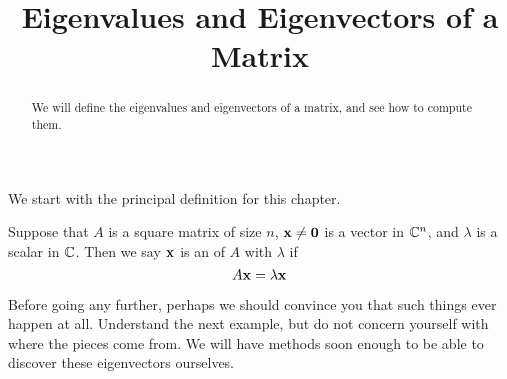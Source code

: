 \documentclass{ximera}
\title{Eigenvalues and Eigenvectors of a Matrix}
\begin{document}
\begin{abstract}
  We will define the eigenvalues and eigenvectors of a matrix, and see how to compute them.  
\end{abstract}
\maketitle

We start with the principal definition for this chapter.

\begin{definition}
  Suppose that $A$ is a square matrix of size $n$,
  $\mathbf{x}\neq\mathbf{0}$ is a vector in $\mathbb{C}^{n}$, and
  $\lambda$ is a scalar in $\mathbb{C}$.  Then we say $\mathbf{x}$ is an
   of $A$ with  $\lambda$ if
  \[
    A\mathbf{x}=\lambda\mathbf{x}
  \]
\end{definition}

Before going any further, perhaps we should convince you that such
things ever happen at all.  Understand the next example, but do not
concern yourself with where the pieces come from.  We will have
methods soon enough to be able to discover these eigenvectors
ourselves.
\end{document}
